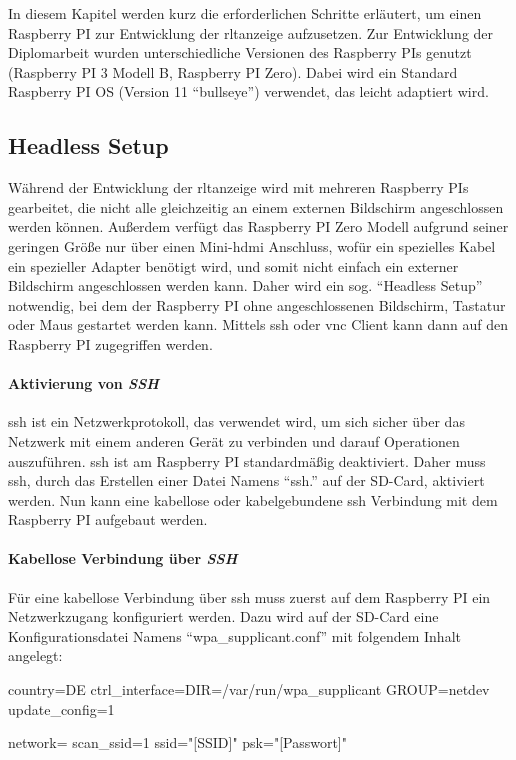 \label{raspi_setup}
In diesem Kapitel werden kurz die erforderlichen Schritte erläutert, um einen Raspberry PI zur Entwicklung der \ac{rltanzeige} aufzusetzen.
Zur Entwicklung der Diplomarbeit wurden unterschiedliche Versionen des Raspberry PIs genutzt (Raspberry PI 3 Modell B, Raspberry PI Zero). Dabei wird ein Standard Raspberry PI OS (Version 11 \enquote{bullseye}) verwendet, das leicht adaptiert wird.

\subsection{Headless Setup}\label{raspi_headless_setup}
Während der Entwicklung der \ac{rltanzeige} wird mit mehreren Raspberry PIs gearbeitet, die nicht alle gleichzeitig an einem externen Bildschirm angeschlossen werden können. Außerdem verfügt das Raspberry PI Zero Modell aufgrund seiner geringen Größe nur über einen Mini-\ac{hdmi} Anschluss, wofür ein spezielles Kabel \bzw ein spezieller Adapter benötigt wird, und somit nicht einfach ein externer Bildschirm angeschlossen werden kann. Daher wird ein sog. \enquote{Headless Setup} notwendig, bei dem der Raspberry PI ohne angeschlossenen Bildschirm, Tastatur oder Maus gestartet werden kann. Mittels \ac{ssh} oder \ac{vnc} Client kann dann auf den Raspberry PI zugegriffen werden.
\cite[vgl.][]{Piltch:2022}

\paragraph{Aktivierung von \textit{SSH}}
\ac{ssh} ist ein Netzwerkprotokoll, das verwendet wird, um sich sicher über das Netzwerk mit einem anderen Gerät zu verbinden und darauf Operationen auszuführen. \ac{ssh} ist am Raspberry PI standardmäßig deaktiviert.  Daher muss \ac{ssh}, durch das Erstellen einer Datei Namens \enquote{ssh.} auf der SD-Card, aktiviert werden. Nun kann eine kabellose oder kabelgebundene \ac{ssh} Verbindung mit dem Raspberry PI aufgebaut werden.

\paragraph{Kabellose Verbindung über \textit{SSH}}
Für eine kabellose Verbindung über \ac{ssh} muss zuerst auf dem Raspberry PI ein Netzwerkzugang konfiguriert werden. Dazu wird auf der SD-Card eine Konfigurationsdatei Namens \enquote{wpa\_supplicant.conf} mit folgendem Inhalt angelegt:
\begin{textcode}
country=DE
ctrl_interface=DIR=/var/run/wpa_supplicant GROUP=netdev
update_config=1

network={
    scan_ssid=1
    ssid="[SSID]"
    psk="[Passwort]"
}
\end{textcode}

